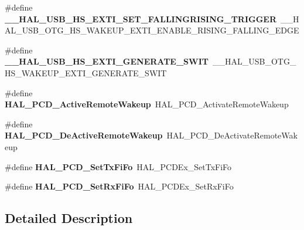 \begin{DoxyCompactItemize}
\item 
\hypertarget{group___h_a_l___u_s_b___aliased___macros_ga112c32a1dea904f42275b7067ca4f4d1}{\#define {\bfseries \-\_\-\-\_\-\-H\-A\-L\-\_\-\-U\-S\-B\-\_\-\-H\-S\-\_\-\-E\-X\-T\-I\-\_\-\-S\-E\-T\-\_\-\-F\-A\-L\-L\-I\-N\-G\-R\-I\-S\-I\-N\-G\-\_\-\-T\-R\-I\-G\-G\-E\-R}~\-\_\-\-\_\-\-H\-A\-L\-\_\-\-U\-S\-B\-\_\-\-O\-T\-G\-\_\-\-H\-S\-\_\-\-W\-A\-K\-E\-U\-P\-\_\-\-E\-X\-T\-I\-\_\-\-E\-N\-A\-B\-L\-E\-\_\-\-R\-I\-S\-I\-N\-G\-\_\-\-F\-A\-L\-L\-I\-N\-G\-\_\-\-E\-D\-G\-E}\label{group___h_a_l___u_s_b___aliased___macros_ga112c32a1dea904f42275b7067ca4f4d1}

\item 
\hypertarget{group___h_a_l___u_s_b___aliased___macros_ga5439cec1ebe6cc15a3a9d3f30f9fa617}{\#define {\bfseries \-\_\-\-\_\-\-H\-A\-L\-\_\-\-U\-S\-B\-\_\-\-H\-S\-\_\-\-E\-X\-T\-I\-\_\-\-G\-E\-N\-E\-R\-A\-T\-E\-\_\-\-S\-W\-I\-T}~\-\_\-\-\_\-\-H\-A\-L\-\_\-\-U\-S\-B\-\_\-\-O\-T\-G\-\_\-\-H\-S\-\_\-\-W\-A\-K\-E\-U\-P\-\_\-\-E\-X\-T\-I\-\_\-\-G\-E\-N\-E\-R\-A\-T\-E\-\_\-\-S\-W\-I\-T}\label{group___h_a_l___u_s_b___aliased___macros_ga5439cec1ebe6cc15a3a9d3f30f9fa617}

\item 
\hypertarget{group___h_a_l___u_s_b___aliased___macros_gaf7a3fc7d87b9ef4947082e8bba921480}{\#define {\bfseries H\-A\-L\-\_\-\-P\-C\-D\-\_\-\-Active\-Remote\-Wakeup}~H\-A\-L\-\_\-\-P\-C\-D\-\_\-\-Activate\-Remote\-Wakeup}\label{group___h_a_l___u_s_b___aliased___macros_gaf7a3fc7d87b9ef4947082e8bba921480}

\item 
\hypertarget{group___h_a_l___u_s_b___aliased___macros_ga3aa67b4ed925bf6e4f9f22054037e243}{\#define {\bfseries H\-A\-L\-\_\-\-P\-C\-D\-\_\-\-De\-Active\-Remote\-Wakeup}~H\-A\-L\-\_\-\-P\-C\-D\-\_\-\-De\-Activate\-Remote\-Wakeup}\label{group___h_a_l___u_s_b___aliased___macros_ga3aa67b4ed925bf6e4f9f22054037e243}

\item 
\hypertarget{group___h_a_l___u_s_b___aliased___macros_ga7583d6ad8bc46cf004c4e7d4d75a29a4}{\#define {\bfseries H\-A\-L\-\_\-\-P\-C\-D\-\_\-\-Set\-Tx\-Fi\-Fo}~H\-A\-L\-\_\-\-P\-C\-D\-Ex\-\_\-\-Set\-Tx\-Fi\-Fo}\label{group___h_a_l___u_s_b___aliased___macros_ga7583d6ad8bc46cf004c4e7d4d75a29a4}

\item 
\hypertarget{group___h_a_l___u_s_b___aliased___macros_gaa57fb6445f12a2e697a1f61e0b748c4b}{\#define {\bfseries H\-A\-L\-\_\-\-P\-C\-D\-\_\-\-Set\-Rx\-Fi\-Fo}~H\-A\-L\-\_\-\-P\-C\-D\-Ex\-\_\-\-Set\-Rx\-Fi\-Fo}\label{group___h_a_l___u_s_b___aliased___macros_gaa57fb6445f12a2e697a1f61e0b748c4b}

\end{DoxyCompactItemize}


\subsection{Detailed Description}
